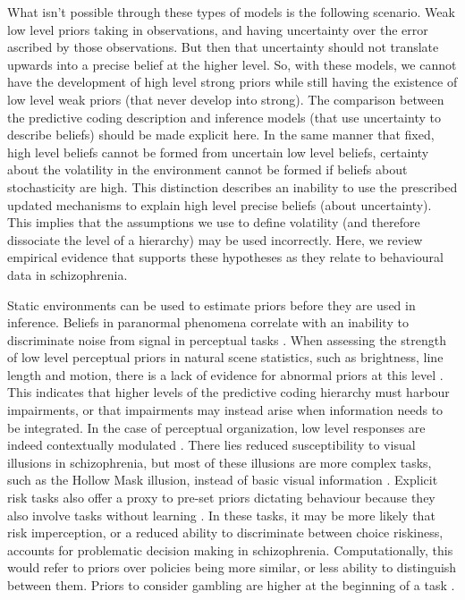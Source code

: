 \documentclass{article}
\begin{document}
What isn't possible through these types of models is the following scenario. Weak low level priors taking in observations, and having uncertainty over the error ascribed by those observations. But then that uncertainty should not translate upwards into a precise belief at the higher level. So, with these models, we cannot have the development of high level strong priors while still having the existence of low level weak priors (that never develop into strong). The comparison between the predictive coding description and inference models (that use uncertainty to describe beliefs) should be made explicit here. In the same manner that fixed, high level beliefs cannot be formed from uncertain low level beliefs, certainty about the volatility in the environment cannot be formed if beliefs about stochasticity are high. This distinction describes an inability to use the prescribed updated mechanisms to explain high level precise beliefs (about uncertainty). This implies that the assumptions we use to define volatility (and therefore dissociate the level of a hierarchy) may be used incorrectly. Here, we review empirical evidence that supports these hypotheses as they relate to behavioural data in schizophrenia.

Static environments can be used to estimate priors before they are used in inference. Beliefs in paranormal phenomena correlate with an inability to discriminate noise from signal in perceptual tasks \citep{seymour2022believing}. When assessing the strength of low level perceptual priors in natural scene statistics, such as brightness, line length and motion, there is a lack of evidence for abnormal priors at this level \citep{kaliuzhna2019no}. This indicates that higher levels of the predictive coding hierarchy must harbour impairments, or that impairments may instead arise when information needs to be integrated. In the case of perceptual organization, low level responses are indeed contextually modulated \citep{seymour2013altered}. There lies reduced susceptibility to visual illusions in schizophrenia, but most of these illusions are more complex tasks, such as the Hollow Mask illusion, instead of basic visual information \citep{notredame2014what}. Explicit risk tasks also offer a proxy to pre-set priors dictating behaviour because they also involve tasks without learning \citep{purcel2022review}. In these tasks, it may be more likely that risk imperception, or a reduced ability to discriminate between choice riskiness, accounts for problematic decision making in schizophrenia. Computationally, this would refer to priors over policies being more similar, or less ability to distinguish between them. Priors to consider gambling are higher at the beginning of a task \citep{kirschner2024transdiagnostic}.
\end{document}

